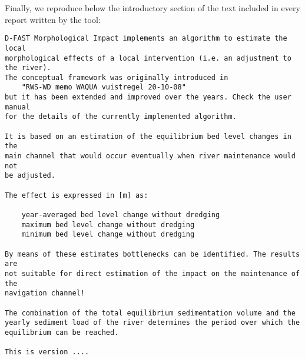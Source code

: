 Finally, we reproduce below the introductory section of the text included in every report written by the tool:

\begin{Verbatim}[frame=single, framesep=5pt]
D-FAST Morphological Impact implements an algorithm to estimate the local
morphological effects of a local intervention (i.e. an adjustment to the river).
The conceptual framework was originally introduced in
    "RWS-WD memo WAQUA vuistregel 20-10-08"
but it has been extended and improved over the years. Check the user manual
for the details of the currently implemented algorithm.

It is based on an estimation of the equilibrium bed level changes in the
main channel that would occur eventually when river maintenance would not
be adjusted.

The effect is expressed in [m] as:

    year-averaged bed level change without dredging
    maximum bed level change without dredging
    minimum bed level change without dredging

By means of these estimates bottlenecks can be identified. The results are
not suitable for direct estimation of the impact on the maintenance of the
navigation channel!

The combination of the total equilibrium sedimentation volume and the
yearly sediment load of the river determines the period over which the
equilibrium can be reached.

This is version ....
\end{Verbatim}
